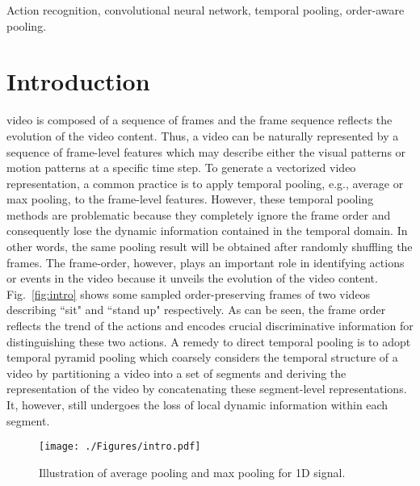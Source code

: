 \documentclass[journal]{IEEEtran}
\begin{document}
%
\begin{IEEEkeywords}
Action recognition, convolutional neural network, temporal pooling, order-aware pooling.
\end{IEEEkeywords}






%
%
%
%
%
%
%
%
\IEEEpeerreviewmaketitle


\tableofcontents




\section{Introduction}



 video is composed of a sequence of frames and the frame sequence reflects the evolution of the video content. Thus, a video can be naturally represented by a sequence of frame-level features which may describe either the visual patterns or motion patterns at a specific time step. To generate a vectorized video representation, a common practice is to apply temporal pooling, e.g., average or max pooling, to the frame-level features. However, these temporal pooling methods are problematic because they completely ignore the frame order and consequently lose the dynamic information contained in the temporal domain. In other words, the same pooling result will be obtained after randomly shuffling the frames. The frame-order, however, plays an important role in identifying actions or events in the video because it unveils the evolution of the video content. Fig.~\ref{fig:intro} shows some sampled order-preserving frames of two videos describing ``sit" and ``stand up" respectively. As can be seen, the frame order reflects the trend of the actions and encodes crucial discriminative information for distinguishing these two actions. A remedy to direct temporal pooling is to adopt temporal pyramid pooling which coarsely considers the temporal structure of a video by partitioning a video into a set of segments and deriving the representation of the video by concatenating these segment-level representations. It, however, still undergoes the loss of local dynamic information within each segment.

\begin{figure}[t]
\begin{center}
\captionsetup{justification=centering}
\texttt{[image: ./Figures/intro.pdf]}
\end{center}
   \caption{Illustration of average pooling and max pooling for 1D signal.}
\label{fig:intro0}
\end{figure}
\end{document}
